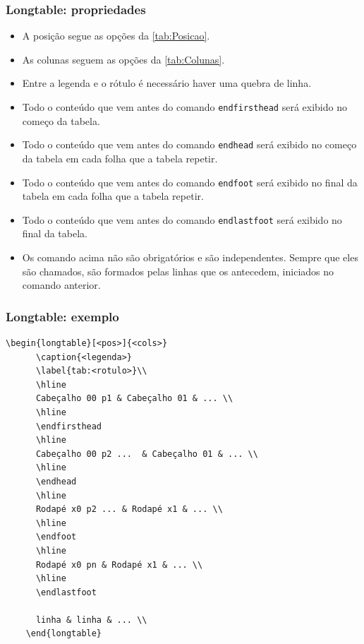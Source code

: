 \documentclass[brazilian]{beamer}
\begin{document}
\begin{frame}[fragile]
  \frametitle{Longtable: propriedades}

  \begin{itemize}
    \item A posição segue as opções da \cref{tab:Posicao}.
    \item As colunas seguem as opções da \cref{tab:Colunas}.
    \item Entre a legenda e o rótulo é necessário haver uma quebra de linha.
    \item Todo o conteúdo que vem antes do comando \lstinline[style=myStyleLatex]!endfirsthead! será exibido no começo da tabela.
    \item Todo o conteúdo que vem antes do comando \lstinline[style=myStyleLatex]!endhead! será exibido no começo da tabela em cada folha que a tabela repetir.
    \item Todo o conteúdo que vem antes do comando \lstinline[style=myStyleLatex]!endfoot! será exibido no final da tabela em cada folha que a tabela repetir.
    \item Todo o conteúdo que vem antes do comando \lstinline[style=myStyleLatex]!endlastfoot! será exibido no final da tabela.
    \item Os comando acima não são obrigatórios e são independentes. Sempre que eles são chamados, são formados pelas linhas que os antecedem, iniciados no comando anterior.
  \end{itemize}

\end{frame}

\begin{frame}[fragile]
  \frametitle{Longtable: exemplo}
\tiny
  \begin{lstlisting}[style=myStyleLatex]
    \begin{longtable}[<pos>]{<cols>}
      \caption{<legenda>}
      \label{tab:<rotulo>}\\
      \hline
      Cabeçalho 00 p1 & Cabeçalho 01 & ... \\ 
      \hline
      \endfirsthead
      \hline
      Cabeçalho 00 p2 ...  & Cabeçalho 01 & ... \\ 
      \hline 
      \endhead
      \hline
      Rodapé x0 p2 ... & Rodapé x1 & ... \\ 
      \hline
      \endfoot
      \hline
      Rodapé x0 pn & Rodapé x1 & ... \\ 
      \hline
      \endlastfoot
      
      linha & linha & ... \\
    \end{longtable} 
  \end{lstlisting}

\end{frame}
\end{document}
